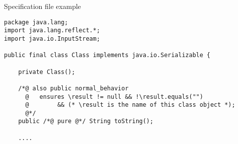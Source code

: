 \documentclass[
pdf,
nocolorBG,
slideColor,
cok,
]{prosper}
\newcommand{\bsl}{\char'134}
\newcommand{\result}{\bsl result}
\begin{document}
\begin{slide}{Specification file example}
\vspace*{-6ex}
\tiny
\begin{verbatim}
package java.lang;
import java.lang.reflect.*;
import java.io.InputStream;

public final class Class implements java.io.Serializable {

    private Class();

    /*@ also public normal_behavior
      @   ensures \result != null && !\result.equals("")
      @        && (* \result is the name of this class object *);
      @*/
    public /*@ pure @*/ String toString();

    ....


\end{verbatim}
\end{slide}
\end{document}
